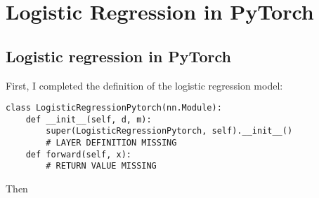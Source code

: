 \documentclass[a4paper,12pt]{article}
\begin{document}
\section{Logistic Regression in PyTorch}

\subsection{Logistic regression in PyTorch}
First, I completed the definition of the logistic regression model:
\begin{lstlisting}
class LogisticRegressionPytorch(nn.Module):
    def __init__(self, d, m):
        super(LogisticRegressionPytorch, self).__init__()
        # LAYER DEFINITION MISSING
    def forward(self, x):
        # RETURN VALUE MISSING
\end{lstlisting}
Then 
\end{document}
